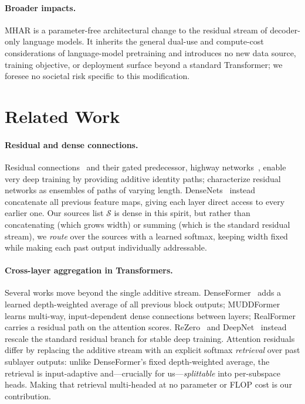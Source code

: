 \documentclass{article}
\begin{document}
\paragraph{Broader impacts.} MHAR is a parameter-free architectural change to the
residual stream of decoder-only language models. It inherits the general dual-use and
compute-cost considerations of language-model pretraining and introduces no new data
source, training objective, or deployment surface beyond a standard Transformer; we
foresee no societal risk specific to this modification.
\fi




\appendix

\section{Related Work}
\label{sec:related}

\paragraph{Residual and dense connections.} Residual connections~\citep{he2016deep}
and their gated predecessor, highway networks~\citep{srivastava2015highway},
enable very deep training by providing additive identity paths; \citet{veit2016residual}
characterize residual networks as ensembles of paths of varying length.
DenseNets~\citep{huang2017densely} instead concatenate all previous feature
maps, giving each layer direct access to every earlier one. Our sources list
$\mathcal{S}$ is dense in this spirit, but rather than concatenating (which grows
width) or summing (which is the standard residual stream), we \emph{route} over
the sources with a learned softmax, keeping width fixed while making each past
output individually addressable.

\paragraph{Cross-layer aggregation in Transformers.} Several works move beyond the
single additive stream. DenseFormer~\citep{pagliardini2024denseformer} adds a learned
depth-weighted average of all previous block outputs; MUDDFormer~\citep{wang2024muddformer}
learns multi-way, input-dependent dense connections between layers;
RealFormer~\citep{he2021realformer} carries a residual path on the attention scores.
ReZero~\citep{bachlechner2020rezero} and DeepNet~\citep{wang2022deepnet} instead
rescale the standard residual branch for stable deep training. Attention residuals
differ by replacing the additive stream with an explicit softmax \emph{retrieval}
over past sublayer outputs: unlike DenseFormer's fixed depth-weighted average, the
retrieval is input-adaptive and---crucially for us---\emph{splittable} into
per-subspace heads. Making that retrieval multi-headed at no parameter or FLOP cost
is our contribution.
\end{document}
